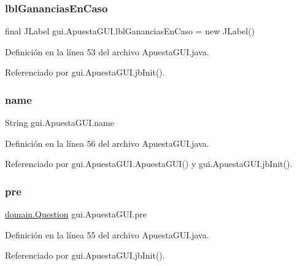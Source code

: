 \subsubsection{\texorpdfstring{lblGananciasEnCaso}{lblGananciasEnCaso}}
{\footnotesize\ttfamily final J\+Label gui.\+Apuesta\+G\+U\+I.\+lbl\+Ganancias\+En\+Caso = new J\+Label()\hspace{0.3cm}{\ttfamily [private]}}



Definición en la línea 53 del archivo Apuesta\+G\+U\+I.\+java.



Referenciado por gui.\+Apuesta\+G\+U\+I.\+jb\+Init().

\mbox{\label{classgui_1_1ApuestaGUI_a520311ac991feb78793eb7a4116739b6}} 
\subsubsection{\texorpdfstring{name}{name}}
{\footnotesize\ttfamily String gui.\+Apuesta\+G\+U\+I.\+name\hspace{0.3cm}{\ttfamily [private]}}



Definición en la línea 56 del archivo Apuesta\+G\+U\+I.\+java.



Referenciado por gui.\+Apuesta\+G\+U\+I.\+Apuesta\+G\+U\+I() y gui.\+Apuesta\+G\+U\+I.\+jb\+Init().

\mbox{\label{classgui_1_1ApuestaGUI_a28da529f5967588873927cc509a27b3a}} 
\subsubsection{\texorpdfstring{pre}{pre}}
{\footnotesize\ttfamily \mbox{\hyperlink{classdomain_1_1Question}{domain.\+Question}} gui.\+Apuesta\+G\+U\+I.\+pre\hspace{0.3cm}{\ttfamily [private]}}



Definición en la línea 55 del archivo Apuesta\+G\+U\+I.\+java.



Referenciado por gui.\+Apuesta\+G\+U\+I.\+jb\+Init().

